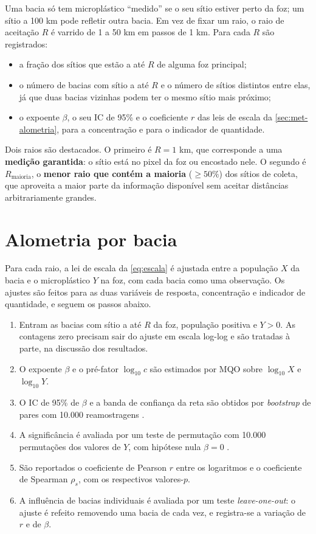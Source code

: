 Uma bacia só tem microplástico ``medido'' se o seu sítio estiver perto da foz; um sítio a 100 km pode refletir outra bacia. Em vez de fixar um raio, o raio de aceitação $R$ é varrido de 1 a 50 km em passos de 1 km. Para cada $R$ são registrados:

\begin{itemize}
	\item a fração dos sítios que estão a até $R$ de alguma foz principal;
	\item o número de bacias com sítio a até $R$ e o número de sítios distintos entre elas, já que duas bacias vizinhas podem ter o mesmo sítio mais próximo;
	\item o expoente $\beta$, o seu IC de 95\% e o coeficiente $r$ das leis de escala da \autoref{sec:met-alometria}, para a concentração e para o indicador de quantidade.
\end{itemize}

Dois raios são destacados. O primeiro é $R = 1$ km, que corresponde a uma \textbf{medição garantida}: o sítio está no pixel da foz ou encostado nele. O segundo é $R_{\mathrm{maioria}}$, o \textbf{menor raio que contém a maioria} ($\geq 50\%$) dos sítios de coleta, que aproveita a maior parte da informação disponível sem aceitar distâncias arbitrariamente grandes.

\section{Alometria por bacia}
\label{sec:met-alometria}

Para cada raio, a lei de escala da \autoref{eq:escala} é ajustada entre a população $X$ da bacia e o microplástico $Y$ na foz, com cada bacia como uma observação. Os ajustes são feitos para as duas variáveis de resposta, concentração e indicador de quantidade, e seguem os passos abaixo.

\begin{enumerate}
	\item Entram as bacias com sítio a até $R$ da foz, população positiva e $Y > 0$. As contagens zero precisam sair do ajuste em escala log-log e são tratadas à parte, na discussão dos resultados.
	\item O expoente $\beta$ e o pré-fator $\log_{10} c$ são estimados por MQO sobre $\log_{10} X$ e $\log_{10} Y$.
	\item O IC de 95\% de $\beta$ e a banda de confiança da reta são obtidos por \textit{bootstrap} de pares com 10.000 reamostragens \cite{efron1979}.
	\item A significância é avaliada por um teste de permutação com 10.000 permutações dos valores de $Y$, com hipótese nula $\beta = 0$ \cite{good2005}.
	\item São reportados o coeficiente de Pearson $r$ entre os logaritmos e o coeficiente de Spearman $\rho_s$, com os respectivos valores-$p$.
	\item A influência de bacias individuais é avaliada por um teste \textit{leave-one-out}: o ajuste é refeito removendo uma bacia de cada vez, e registra-se a variação de $r$ e de $\beta$.
\end{enumerate}

